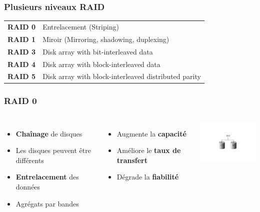 \begin{frame}
\frametitle{Plusieurs niveaux RAID}
\begin{tabular}{c|l}
\textbf{RAID 0} & Entrelacement (Striping) \\
\textbf{RAID 1} & Miroir (Mirroring, shadowing, duplexing) \\
\textbf{RAID 3} & Disk array with bit-interleaved data \\
\textbf{RAID 4} & Disk array with block-interleaved data \\
\textbf{RAID 5} & Disk array with block-interleaved distributed parity \\
\end{tabular}
\end{frame}


\begin{frame}
\frametitle{RAID 0}
\begin{columns}
\begin{itemize}
\item \textbf{Chaînage} de disques
\item Les disques peuvent être différents
\item \textbf{Entrelacement} des données
\item Agrégats par bandes
\end{itemize}
\begin{itemize}
\item Augmente la \textbf{capacité}
\item Améliore le \textbf{taux de transfert}
\item Dégrade la \textbf{fiabilité}
\end{itemize}
\includegraphics[width=4cm]{../illustration/RAID0.pdf}
\end{columns}
\end{frame}


